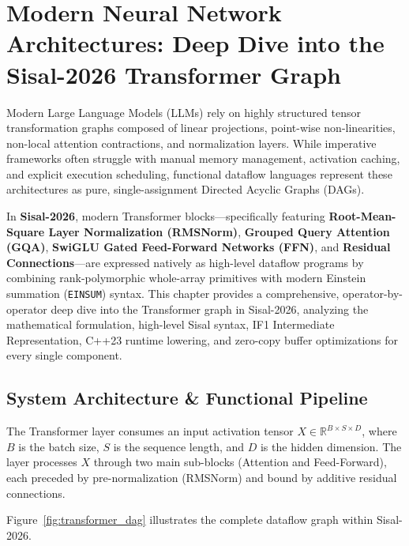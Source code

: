 \chapter{Modern Neural Network Architectures: Deep Dive into the Sisal-2026 Transformer Graph}
\label{chap:transformer_architecture}

Modern Large Language Models (LLMs) rely on highly structured tensor transformation graphs composed of linear projections, point-wise non-linearities, non-local attention contractions, and normalization layers. While imperative frameworks often struggle with manual memory management, activation caching, and explicit execution scheduling, functional dataflow languages represent these architectures as pure, single-assignment Directed Acyclic Graphs (DAGs).

In \textbf{Sisal-2026}, modern Transformer blocks---specifically featuring \textbf{Root-Mean-Square Layer Normalization (RMSNorm)}, \textbf{Grouped Query Attention (GQA)}, \textbf{SwiGLU Gated Feed-Forward Networks (FFN)}, and \textbf{Residual Connections}---are expressed natively as high-level dataflow programs by combining rank-polymorphic whole-array primitives with modern Einstein summation (\texttt{EINSUM}) syntax. This chapter provides a comprehensive, operator-by-operator deep dive into the Transformer graph in Sisal-2026, analyzing the mathematical formulation, high-level Sisal syntax, IF1 Intermediate Representation, C++23 runtime lowering, and zero-copy buffer optimizations for every single component.

\section{System Architecture \& Functional Pipeline}
\label{sec:transformer_pipeline}

The Transformer layer consumes an input activation tensor $X \in \mathbb{R}^{B \times S \times D}$, where $B$ is the batch size, $S$ is the sequence length, and $D$ is the hidden dimension. The layer processes $X$ through two main sub-blocks (Attention and Feed-Forward), each preceded by pre-normalization (RMSNorm) and bound by additive residual connections.

Figure~\ref{fig:transformer_dag} illustrates the complete dataflow graph within Sisal-2026.

